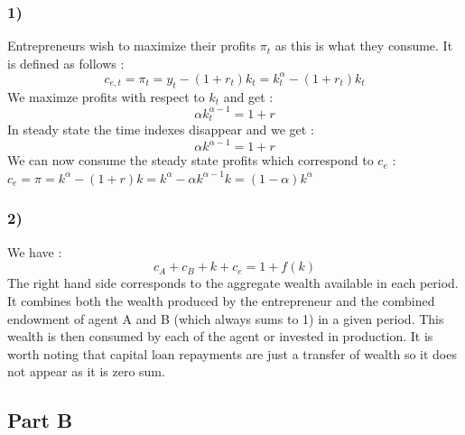 \documentclass{article}
\begin{document}
\subsubsection{1)}
Entrepreneurs wish to maximize their profits $\pi_t$ as this is what they consume. It is defined as follows : 
$$c_{e,t}=\pi_t = y_t-(1+r_t)k_{t} = k_t^\alpha -(1+r_t)k_{t}$$
We maximze profits with respect to $k_t$ and get : 
$$\alpha k_t^{\alpha-1}=1+r$$
In steady state the time indexes disappear and we get : 
$$\alpha k^{\alpha-1}=1+r$$
We can now consume the steady state profits which correspond to $c_{e}$ :
$c_e = \pi = k^{\alpha}-(1+r)k = k^{\alpha}-\alpha k^{\alpha-1}k = (1-\alpha)k^{\alpha}$

\subsubsection{2)}
We have : 
$$c_A + c_B + k + c_e =1+f(k)$$
The right hand side corresponds to the aggregate wealth available in each period. It combines both the wealth produced by the entrepreneur and the combined endowment of agent A and B (which always sums to 1) in a given period. This wealth is then consumed by each of the agent or invested in production. It is worth noting that capital loan repayments are just a transfer of wealth so it does not appear as it is zero sum. 

\subsection{Part B}
\end{document}
